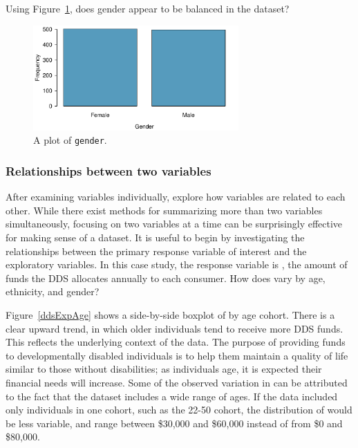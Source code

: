 \begin{exercisewrap}
\begin{nexercise}
Using Figure~\ref{ddsGenderPlot}, does gender appear to be balanced in the  dataset?\footnotemark{}
\end{nexercise}
\end{exercisewrap}

\begin{figure}[h]
	\centering
	\includegraphics[width=0.7\textwidth]{ch_intro_to_data_oi_biostat/figures/ddsGenderPlot/ddsGenderPlot}
	\caption{A plot of \texttt{gender}. }
	\label{ddsGenderPlot}
\end{figure}


\textD{\newpage}


\subsubsection{Relationships between two variables}

After examining variables individually, explore how variables are related to each other. While there exist methods for summarizing more than two variables simultaneously, focusing on two variables at a time can be surprisingly effective for making sense of a dataset. It is useful to begin by investigating the relationships between the primary response variable of interest and the exploratory variables. In this case study, the response variable is , the amount of funds the DDS allocates annually to each consumer. How does  vary by age, ethnicity, and gender?

Figure~\ref{ddsExpAge} shows a side-by-side boxplot of  by age cohort. There is a clear upward trend, in which older individuals tend to receive more DDS funds. This reflects the underlying context of the data. The purpose of providing funds to developmentally disabled individuals is to help them maintain a quality of life similar to those without disabilities; as individuals age, it is expected their financial needs will increase. Some of the observed variation in  can be attributed to the fact that the dataset includes a wide range of ages. If the data included only individuals in one cohort, such as the 22-50 cohort, the distribution of  would be less variable, and range between \$30,000 and \$60,000 instead of from \$0 and \$80,000.


